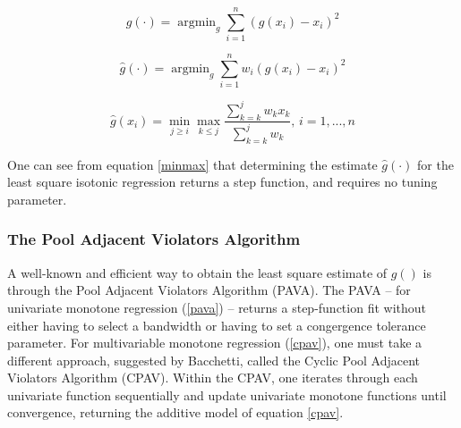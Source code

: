 \documentclass[10pt]{olplainarticle}\usepackage[]{graphicx}\usepackage[]{color}
\DeclareMathOperator*{\argmin}{argmin}
\begin{document}
\begin{equation} \label{lseisotonic}
  \hat{g}(\cdot) = \argmin_{g} \sum_{i=1}^{n}(g(x_{i}) - x_{i})^2
\end{equation}

\begin{equation} \label{lseweightedisotonic}
  \hat{g}(\cdot) = \argmin_{g} \sum_{i=1}^{n}w_{i}(g(x_{i}) - x_{i})^2
\end{equation}


\begin{equation} \label{minmax}
  \hat{g}(x_{i}) = \min_{j \geq i} \max_{k \leq j} \frac{\sum_{k=k}^{j}w_{k}x_{k}}{\sum_{k=k}^{j}w_{k}} \text{,   } i = 1,...,n
\end{equation}

One can see from equation \ref{minmax} that determining the estimate $\hat{g}(\cdot)$ for the least square isotonic regression returns a step function, and requires no tuning parameter.

% 




\subsubsection{The Pool Adjacent Violators Algorithm}

A well-known and efficient way to obtain the least square estimate of $g()$ is through the Pool Adjacent Violators Algorithm (PAVA). The PAVA -- for univariate monotone regression (\ref{pava}) -- returns a step-function fit without either having to select a bandwidth or having to set a congergence tolerance parameter. For multivariable monotone regression (\ref{cpav}), one must take a different approach, suggested by Bacchetti, called the Cyclic Pool Adjacent Violators Algorithm (CPAV). Within the CPAV, one iterates through each univariate function sequentially and update univariate monotone functions until convergence, returning the additive model of equation \ref{cpav}.
\end{document}
